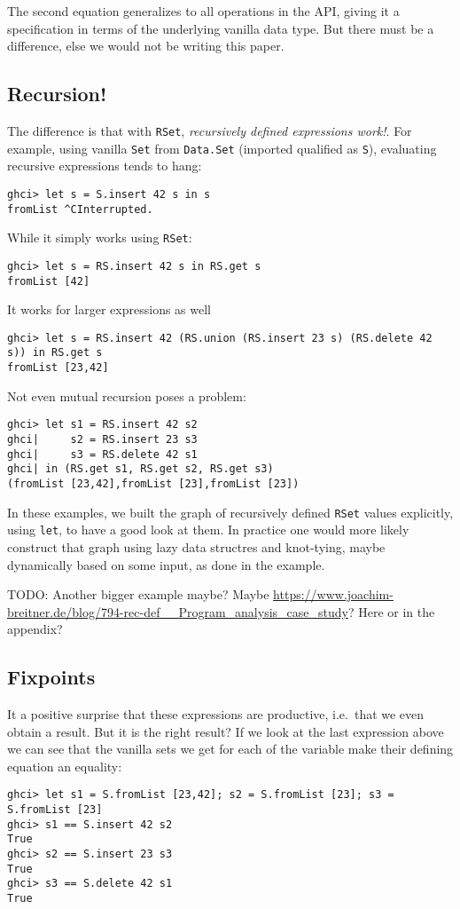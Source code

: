\documentclass[manuscript,screen,acmsmall]{acmart}
\begin{document}
The second equation generalizes to all operations in the API, giving it a specification in terms of the underlying vanilla data type. But there must be a difference, else we would not be writing this paper.

\subsection{Recursion!}

The difference is that with \verb|RSet|, \emph{recursively defined expressions work!}. For example, using vanilla \verb|Set| from \verb|Data.Set| (imported qualified as \verb|S|), evaluating recursive expressions tends to hang:
\begin{verbatim}
ghci> let s = S.insert 42 s in s
fromList ^CInterrupted.
\end{verbatim}
While it simply works using  \verb|RSet|:
\begin{verbatim}
ghci> let s = RS.insert 42 s in RS.get s
fromList [42]
\end{verbatim}
It works for larger expressions as well
\begin{verbatim}
ghci> let s = RS.insert 42 (RS.union (RS.insert 23 s) (RS.delete 42 s)) in RS.get s
fromList [23,42]
\end{verbatim}
Not even mutual recursion poses a problem:
\begin{verbatim}
ghci> let s1 = RS.insert 42 s2
ghci|     s2 = RS.insert 23 s3
ghci|     s3 = RS.delete 42 s1
ghci| in (RS.get s1, RS.get s2, RS.get s3)
(fromList [23,42],fromList [23],fromList [23])
\end{verbatim}

In these examples, we built the graph of recursively defined \verb|RSet| values explicitly, using \verb|let|, to have a good look at them. In practice one would more likely construct that graph using lazy data structres and knot-tying, maybe dynamically based on some input, as done in the example.

TODO: Another bigger example maybe? Maybe \url{https://www.joachim-breitner.de/blog/794-rec-def__Program_analysis_case_study}? Here or in the appendix?

\subsection{Fixpoints}

It a positive surprise that these expressions are productive, i.e.\ that we even obtain a result. But it is the right result? If we look at the last expression above we can see that the vanilla sets we get for each of the variable make their defining equation an equality:
\begin{verbatim}
ghci> let s1 = S.fromList [23,42]; s2 = S.fromList [23]; s3 = S.fromList [23]
ghci> s1 == S.insert 42 s2
True
ghci> s2 == S.insert 23 s3
True
ghci> s3 == S.delete 42 s1
True
\end{verbatim}
\end{document}
